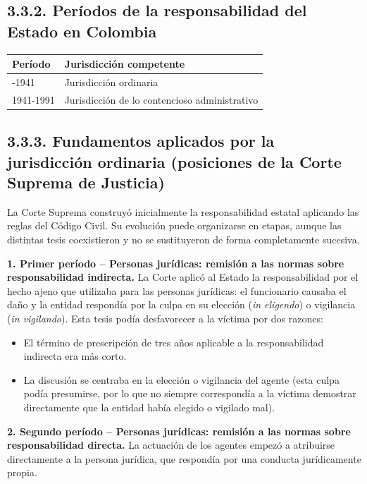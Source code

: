 \subsection{3.3.2. Períodos de la responsabilidad del Estado en Colombia}
\begin{tabla}
\begin{longtable}{|>{\raggedright\arraybackslash}m{}|>{\raggedright\arraybackslash}m{}|}
\hline
\cellcolor[HTML]{1F3864}\textcolor[HTML]{FFFFFF}{\textbf{Período}} & \cellcolor[HTML]{1F3864}\textcolor[HTML]{FFFFFF}{\textbf{Jurisdicción competente}} \\ \hline
1886-1941 & Jurisdicción ordinaria \\ \hline
\cellcolor[HTML]{F2F5FA}1941-1991 & \cellcolor[HTML]{F2F5FA}Jurisdicción de lo contencioso administrativo \\ \hline
\end{longtable}
\end{tabla}
\subsection{3.3.3. Fundamentos aplicados por la jurisdicción ordinaria (posiciones de la Corte Suprema de Justicia)}
La Corte Suprema construyó inicialmente la responsabilidad estatal aplicando las reglas del Código Civil. Su evolución puede organizarse en etapas, aunque las distintas tesis coexistieron y no se sustituyeron de forma completamente sucesiva.

\textbf{1. Primer período – Personas jurídicas: remisión a las normas sobre responsabilidad indirecta.} La Corte aplicó al Estado la responsabilidad por el hecho ajeno que utilizaba para las personas jurídicas: el funcionario causaba el daño y la entidad respondía por la culpa en su elección (\textit{in eligendo}) o vigilancia (\textit{in vigilando}). Esta tesis podía desfavorecer a la víctima por dos razones:

\begin{itemize}
\item El término de prescripción de tres años aplicable a la responsabilidad indirecta era más corto.
\item La discusión se centraba en la elección o vigilancia del agente (esta culpa podía presumirse, por lo que no siempre correspondía a la víctima demostrar directamente que la entidad había elegido o vigilado mal).
\end{itemize}
\textbf{2. Segundo período – Personas jurídicas: remisión a las normas sobre responsabilidad directa.} La actuación de los agentes empezó a atribuirse directamente a la persona jurídica, que respondía por una conducta jurídicamente propia.


